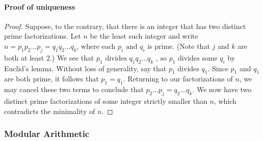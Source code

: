 \documentclass[MathsNotesBase.tex]{subfiles}
\begin{document}
{		\paragraph{Proof of uniqueness}
		\begin{proof}
			Suppose, to the contrary, that there is an integer that has two distinct prime factorizations. Let $ n $ be the least such integer and write $ n = p_1 p_2 ... p_j = q_1 q_2 ... q_k $, where each $ p_i \text{ and } q_i $ is prime. (Note that $ j $ and $ k $ are both at least $ 2 $.) We see that $ p_1 \text{ divides } q_1 q_2 ... q_k\text{ , so } p_1\text{  divides some } q_i $ by Euclid's lemma. Without loss of generality, say that $ p_1 \text{ divides } q_1 $. Since $ p_1 $ and $ q_1 $ are both prime, it follows that $ p_1 = q_1 $. Returning to our factorizations of $ n $, we may cancel these two terms to conclude that $ p_2 ... p_j = q_2 ... q_k $. We now have two distinct prime factorizations of some integer strictly smaller than $ n $, which contradicts the minimality of $ n $.
		\end{proof}
		
		
		\pagebreak
		\subsubsection{Modular Arithmetic}\bigskip
		
}
\end{document}

